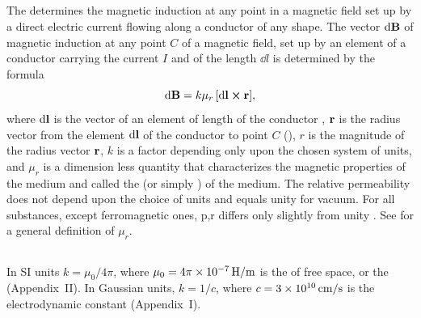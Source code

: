 \subsection{}\label{23.2.1} The  determines the magnetic induction at any point in a magnetic field set up by a direct electric current flowing along a conductor of any shape. The vector $\dd \vb{B}$ of magnetic induction at any point $C$ of a magnetic field, set up by an element of a conductor carrying the current $I$ and of the length $\dd l$ is determined by the formula
\begin{equation*}%
\dd \vb{B}= k \mu_{r} \, [\dd \vb{l} \cross \vb{r}],
\end{equation*}
where $\dd \vb{l}$ is the vector of an element of length of the conductor , $\vb{r}$ is the radius vector from the element $\dd \vb{l}$ of the conductor to point $C$ (), $r$ is the magnitude of the radius vector $\vb{r}$, $k$ is a factor depending only upon the chosen system of units, and $\mu_{r}$ is a dimension­ less quantity that characterizes the magnetic properties of the medium and called the  (or simply  ) of the medium. The relative permeability does not depend upon the choice of units and equals unity for vacuum. For all substances, except ferromagnetic ones, p,r differs only slightly from unity . See  for a general definition of $\mu_{r}$.



\subsection{}\label{23.2.2} In SI units $k = \mu_{0}/4\pi$, where $\mu_{0} = 4\pi \times \SI{d-7}{\henry\per\meter}$ is the  of free space, or the  (Appen­dix~II). In Gaussian units, $k = 1/c$, where $c = \SI{3d10}{\centi\meter\per\second}$ is the electrodynamic constant (Appendix~I).


